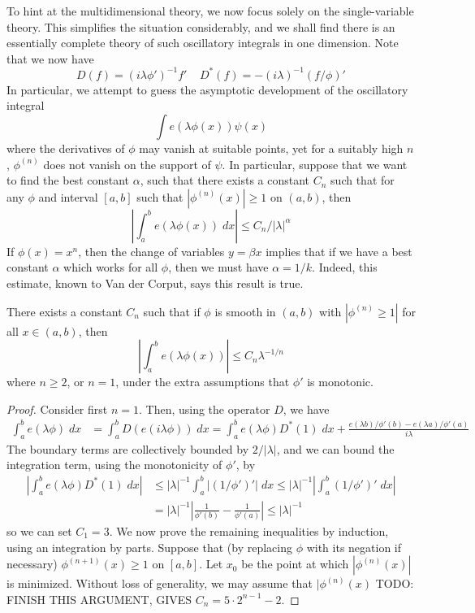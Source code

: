To hint at the multidimensional theory, we now focus solely on the single-variable theory. This simplifies the situation considerably, and we shall find there is an essentially complete theory of such oscillatory integrals in one dimension. Note that we now have
%
\[ D(f) = (i\lambda \phi')^{-1} f'\ \ \ \ \ D^*(f) = -(i \lambda)^{-1} (f/\phi)' \]
%
In particular, we attempt to guess the asymptotic development of the oscillatory integral
%
\[ \int e(\lambda \phi(x)) \psi(x) \]
%
where the derivatives of $\phi$ may vanish at suitable points, yet for a suitably high $n$, $\phi^{(n)}$ does not vanish on the support of $\psi$. In particular, suppose that we want to find the best constant $\alpha$, such that there exists a constant $C_n$ such that for any $\phi$ and interval $[a,b]$ such that $|\phi^{(n)}(x)| \geq 1$ on $(a,b)$, then
%
\[ \left| \int_a^b e(\lambda \phi(x))\; dx \right| \leq C_n/|\lambda|^\alpha \]
%
If $\phi(x) = x^n$, then the change of variables $y = \beta x$ implies that if we have a best constant $\alpha$ which works for all $\phi$, then we must have $\alpha = 1/k$. Indeed, this estimate, known to Van der Corput, says this result is true.

\begin{theorem}
    There exists a constant $C_n$ such that if $\phi$ is smooth in $(a,b)$ with $|\phi^{(n)} \geq 1|$ for all $x \in (a,b)$, then
    \[ \left| \int_a^b e(\lambda \phi(x)) \right| \leq C_n \lambda^{-1/n} \]
    where $n \geq 2$, or $n = 1$, under the extra assumptions that $\phi'$ is monotonic.
\end{theorem}
\begin{proof}
    Consider first $n = 1$. Then, using the operator $D$, we have
    \begin{align*}
        \int_a^b e(\lambda \phi)\; dx &= \int_a^b D(e(i \lambda \phi))\; dx = \int_a^b e(\lambda \phi) D^*(1)\; dx + \frac{e(\lambda b)/\phi'(b) - e(\lambda a)/\phi'(a)}{i \lambda}
    \end{align*}
    The boundary terms are collectively bounded by $2/|\lambda|$, and we can bound the integration term, using the monotonicity of $\phi'$, by
    \begin{align*}
        \left| \int_a^b e(\lambda \phi) D^*(1)\; dx \right| &\leq |\lambda|^{-1} \int_a^b |(1/\phi')'|\; dx \leq |\lambda|^{-1} \left| \int_a^b (1/\phi')'\; dx \right|\\
        &= |\lambda|^{-1} \left| \frac{1}{\phi'(b)} - \frac{1}{\phi'(a)} \right| \leq |\lambda|^{-1}
    \end{align*}
    so we can set $C_1 = 3$. We now prove the remaining inequalities by induction, using an integration by parts. Suppose that (by replacing $\phi$ with its negation if necessary) $\phi^{(n+1)}(x) \geq 1$ on $[a,b]$. Let $x_0$ be the point at which $|\phi^{(n)}(x)|$ is minimized. Without loss of generality, we may assume that $|\phi^{(n)}(x)$ TODO: FINISH THIS ARGUMENT, GIVES $C_n = 5 \cdot 2^{n-1} - 2$.
\end{proof}

